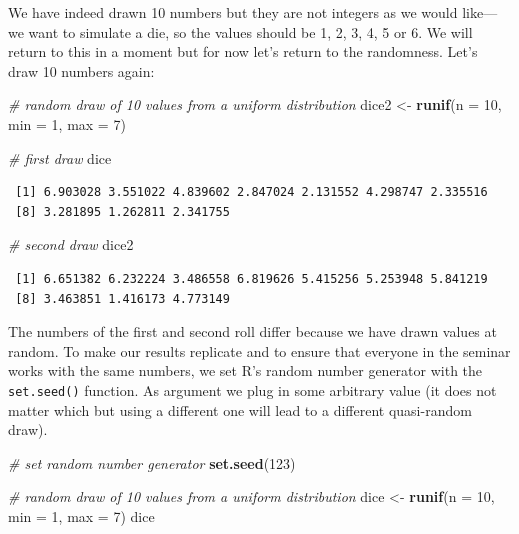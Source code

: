 \documentclass[]{article}
\newenvironment{Shaded}{\begin{snugshade}}{\end{snugshade}}
\newcommand{\KeywordTok}[1]{\textcolor[rgb]{0.13,0.29,0.53}{\textbf{#1}}}
\newcommand{\DataTypeTok}[1]{\textcolor[rgb]{0.13,0.29,0.53}{#1}}
\newcommand{\DecValTok}[1]{\textcolor[rgb]{0.00,0.00,0.81}{#1}}
\newcommand{\StringTok}[1]{\textcolor[rgb]{0.31,0.60,0.02}{#1}}
\newcommand{\CommentTok}[1]{\textcolor[rgb]{0.56,0.35,0.01}{\textit{#1}}}
\newcommand{\NormalTok}[1]{#1}
\theoremstyle{definition}
\theoremstyle{definition}
\theoremstyle{definition}
\theoremstyle{remark}
\begin{document}
We have indeed drawn 10 numbers but they are not integers as we would
like---we want to simulate a die, so the values should be 1, 2, 3, 4, 5
or 6. We will return to this in a moment but for now let's return to the
randomness. Let's draw 10 numbers again:

\begin{Shaded}
\begin{Highlighting}[]
\CommentTok{# random draw of 10 values from a uniform distribution}
\NormalTok{dice2 <-}\StringTok{ }\KeywordTok{runif}\NormalTok{(}\DataTypeTok{n =} \DecValTok{10}\NormalTok{, }\DataTypeTok{min =} \DecValTok{1}\NormalTok{, }\DataTypeTok{max =} \DecValTok{7}\NormalTok{)}

\CommentTok{# first draw}
\NormalTok{dice}
\end{Highlighting}
\end{Shaded}

\begin{verbatim}
 [1] 6.903028 3.551022 4.839602 2.847024 2.131552 4.298747 2.335516
 [8] 3.281895 1.262811 2.341755
\end{verbatim}

\begin{Shaded}
\begin{Highlighting}[]
\CommentTok{# second draw}
\NormalTok{dice2}
\end{Highlighting}
\end{Shaded}

\begin{verbatim}
 [1] 6.651382 6.232224 3.486558 6.819626 5.415256 5.253948 5.841219
 [8] 3.463851 1.416173 4.773149
\end{verbatim}

The numbers of the first and second roll differ because we have drawn
values at random. To make our results replicate and to ensure that
everyone in the seminar works with the same numbers, we set R's random
number generator with the \texttt{set.seed()} function. As argument we
plug in some arbitrary value (it does not matter which but using a
different one will lead to a different quasi-random draw).

\begin{Shaded}
\begin{Highlighting}[]
\CommentTok{# set random number generator}
\KeywordTok{set.seed}\NormalTok{(}\DecValTok{123}\NormalTok{)}

\CommentTok{# random draw of 10 values from a uniform distribution}
\NormalTok{dice <-}\StringTok{ }\KeywordTok{runif}\NormalTok{(}\DataTypeTok{n =} \DecValTok{10}\NormalTok{, }\DataTypeTok{min =} \DecValTok{1}\NormalTok{, }\DataTypeTok{max =} \DecValTok{7}\NormalTok{)}
\NormalTok{dice}
\end{Highlighting}
\end{Shaded}
\end{document}
